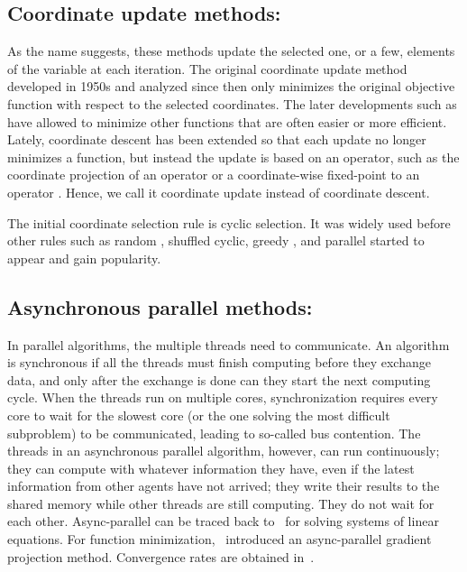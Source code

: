 \subsection*{Coordinate update methods:}
As the name suggests, these methods update the selected one, or a few, elements of the variable at each iteration. The original  coordinate update method \citep{Hildreth1957_quadratic,Warga1963_minimizing,SargentSebastian1973_convergence,LuoTseng1992_convergence} developed in 1950s and analyzed since then only minimizes the original objective function with respect to the selected coordinates. The later developments such as \citep{GrippoSciandrone2000_convergence,TsengYun2009_coordinate,TsengYun2009_blockcoordinate,XuYin2013_block,BolteSabachTeboulle2014_proximal} have allowed to minimize other functions that are often easier or more efficient. Lately, coordinate descent has been extended so that each update no longer minimizes a function, but instead the update is based on an operator, such as the coordinate projection of an operator or a coordinate-wise fixed-point to an operator \citep{CombettesPesquet2015_stochastic,BianchiHachemFranck2014_stochastic,PengXuYanYin2015_arock,PengWuXuYanYin2016_coordinate}. Hence, we call it coordinate update instead of coordinate descent. 

The initial coordinate selection rule  is cyclic selection. It was widely used before other rules such as random \citep{Nesterov2012_efficiency,RichtarikTakac2014_iteration,LuXiao2015_complexity}, shuffled cyclic, greedy \citep{BertsekasBertsekas1999_nonlinear,LiOsher2009_coordinate,TsengYun2009_coordinate,PengYanYin2013_parallel,NutiniSchmidtLaradjiFriedlanderKoepke2015_coordinate}, and parallel \citep{BradleyKyrolaBicksonGuestrin2011_parallel,RichtarikTakac2016_parallel} started to appear and gain popularity.


\subsection*{Asynchronous parallel methods:}  

In  parallel algorithms, the multiple threads need to communicate. An algorithm is synchronous if all the  threads must finish computing before they exchange data, and only after the exchange is done can they start the next computing cycle. When the threads run on multiple cores, synchronization requires every core to wait for the slowest core
(or the one solving the most difficult subproblem) to be communicated,  leading to so-called  bus contention. The threads in an asynchronous parallel algorithm, however, can run continuously; they can compute with whatever information they have, even if the latest information from other agents
have not arrived; they write their results to the shared memory while other threads are still computing. They do not wait for each other. Async-parallel can be traced back to~\citep{chazan1969chaotic} for solving systems of linear equations.
For function minimization,~\citep{bertsekas1989parallel} introduced an async-parallel gradient projection method. Convergence rates are obtained in~\citep{tseng1991rate-asyn}.

